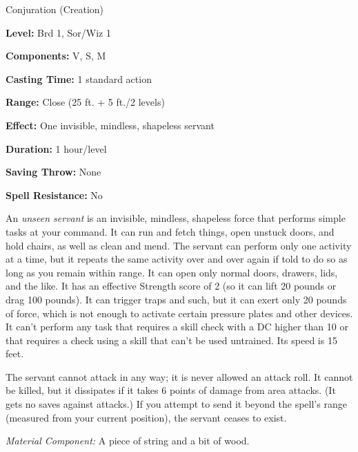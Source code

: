 
Conjuration (Creation)

\textbf{Level:} Brd 1, Sor/Wiz 1

\textbf{Components:} V, S, M

\textbf{Casting Time:} 1 standard action

\textbf{Range:} Close (25 ft. + 5 ft./2 levels)

\textbf{Effect:} One invisible, mindless, shapeless servant

\textbf{Duration:} 1 hour/level

\textbf{Saving Throw:} None

\textbf{Spell Resistance:} No

An \textit{unseen servant} is an invisible, mindless, shapeless force that performs 
simple tasks at your command. It can run and fetch things, open unstuck doors, 
and hold chairs, as well as clean and mend. The servant can perform only one activity 
at a time, but it repeats the same activity over and over again if told to do so 
as long as you remain within range. It can open only normal doors, drawers, lids, 
and the like. It has an effective Strength score of 2 (so it can lift 20 pounds 
or drag 100 pounds). It can trigger traps and such, but it can exert only 20 pounds 
of force, which is not enough to activate certain pressure plates and other devices. 
It can't perform any task that requires a skill check with a DC higher than 10 
or that requires a check using a skill that can't be used untrained. Its speed 
is 15 feet.

The servant cannot attack in any way; it is never allowed an attack roll. It cannot 
be killed, but it dissipates if it takes 6 points of damage from area attacks. 
(It gets no saves against attacks.) If you attempt to send it beyond the spell's 
range (measured from your current position), the servant ceases to exist.

\textit{Material Component:} A piece of string and a bit of wood.

